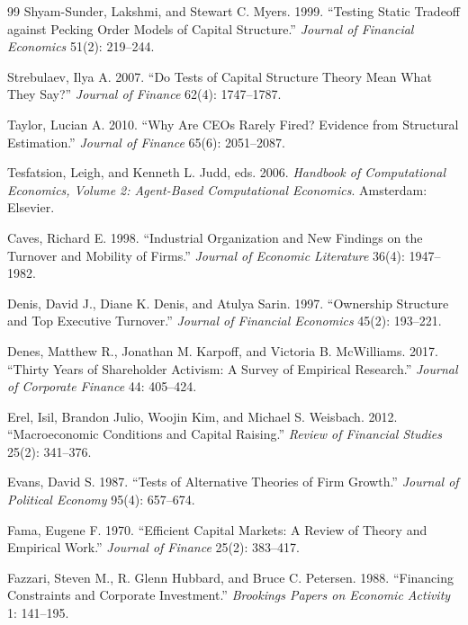\documentclass[11pt]{article}
\begin{document}
\begin{thebibliography}{99}
Shyam-Sunder, Lakshmi, and Stewart C. Myers. 1999. ``Testing Static
Tradeoff against Pecking Order Models of Capital Structure.''
\textit{Journal of Financial Economics} 51(2): 219--244.

Strebulaev, Ilya A. 2007. ``Do Tests of Capital Structure Theory Mean
What They Say?'' \textit{Journal of Finance} 62(4): 1747--1787.

Taylor, Lucian A. 2010. ``Why Are CEOs Rarely Fired? Evidence from
Structural Estimation.'' \textit{Journal of Finance} 65(6):
2051--2087.

Tesfatsion, Leigh, and Kenneth L. Judd, eds. 2006. \textit{Handbook
of Computational Economics, Volume 2: Agent-Based Computational
Economics}. Amsterdam: Elsevier.

Caves, Richard E. 1998. ``Industrial Organization and New Findings
on the Turnover and Mobility of Firms.'' \textit{Journal of Economic
Literature} 36(4): 1947--1982.

Denis, David J., Diane K. Denis, and Atulya Sarin. 1997. ``Ownership
Structure and Top Executive Turnover.'' \textit{Journal of Financial
Economics} 45(2): 193--221.

Denes, Matthew R., Jonathan M. Karpoff, and Victoria B. McWilliams.
2017. ``Thirty Years of Shareholder Activism: A Survey of Empirical
Research.'' \textit{Journal of Corporate Finance} 44: 405--424.

Erel, Isil, Brandon Julio, Woojin Kim, and Michael S. Weisbach.
2012. ``Macroeconomic Conditions and Capital Raising.''
\textit{Review of Financial Studies} 25(2): 341--376.

Evans, David S. 1987. ``Tests of Alternative Theories of Firm
Growth.'' \textit{Journal of Political Economy} 95(4): 657--674.

Fama, Eugene F. 1970. ``Efficient Capital Markets: A Review of
Theory and Empirical Work.'' \textit{Journal of Finance} 25(2):
383--417.

Fazzari, Steven M., R. Glenn Hubbard, and Bruce C. Petersen. 1988.
``Financing Constraints and Corporate Investment.''
\textit{Brookings Papers on Economic Activity} 1: 141--195.


\end{thebibliography}
\end{document}
